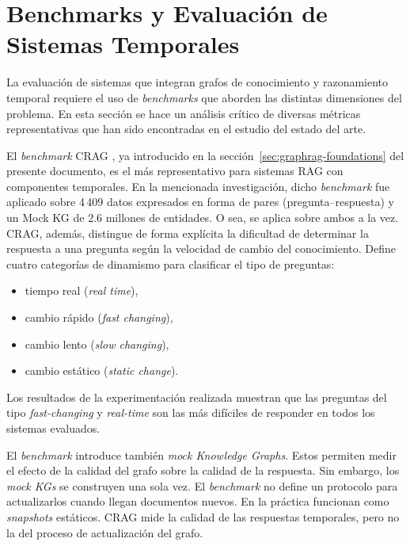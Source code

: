 \section{Benchmarks y Evaluación de Sistemas Temporales}\label{sec:benchmarks}

La evaluación de sistemas que integran grafos de conocimiento y razonamiento temporal requiere el uso de \emph{benchmarks} que aborden las distintas dimensiones del problema. En esta sección se hace un análisis crítico de diversas métricas representativas que han sido encontradas en el estudio del estado del arte.

El \emph{benchmark} CRAG \cite{crag2024}, ya introducido en la sección~\ref{sec:graphrag-foundations} del presente documento, es el más representativo para sistemas RAG con componentes temporales. En la mencionada investigación, dicho \emph{benchmark} fue aplicado sobre 4\,409 datos expresados en forma de pares (pregunta--respuesta) y un Mock KG de 2.6 millones de entidades. O sea, se aplica sobre ambos a la vez. CRAG, además, distingue de forma explícita la dificultad de determinar la respuesta a una pregunta según la velocidad de cambio del conocimiento. Define cuatro categorías de dinamismo para clasificar el tipo de preguntas:
\begin{itemize}
    \item tiempo real (\emph{real time}),
    \item cambio rápido (\emph{fast changing}),
    \item cambio lento (\emph{slow changing}),
    \item cambio estático (\emph{static change}).
\end{itemize}
Los resultados de la experimentación realizada muestran que las preguntas del tipo \emph{fast-changing} y \emph{real-time} son las más difíciles de responder en todos los sistemas evaluados.

El \emph{benchmark} introduce también \emph{mock Knowledge Graphs}. Estos permiten medir el efecto de la calidad del grafo sobre la calidad de la respuesta. Sin embargo, los \emph{mock KGs} se construyen una sola vez. El \emph{benchmark} no define un protocolo para actualizarlos cuando llegan documentos nuevos. En la práctica funcionan como \emph{snapshots} estáticos. CRAG mide la calidad de las respuestas temporales, pero no la del proceso de actualización del grafo.


